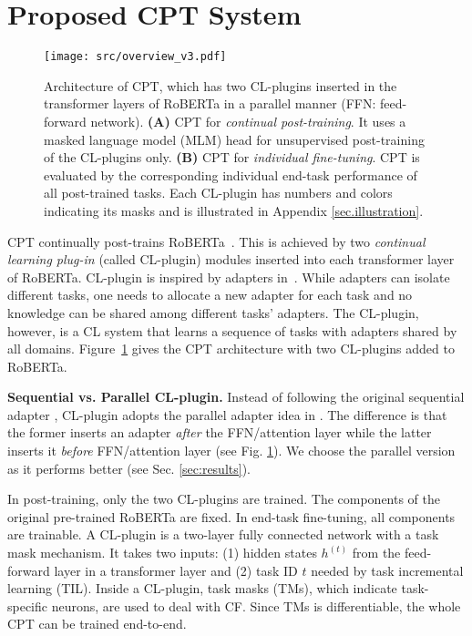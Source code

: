 \documentclass[11pt]{article}
\begin{document}
\section{Proposed CPT System}
\label{sec:cpt}



\begin{figure}[t!]
\centering
\texttt{[image: src/overview\_v3.pdf]}
\vspace{-6mm}
\caption{
Architecture of CPT, which has two CL-plugins inserted in the transformer layers of RoBERTa in a parallel manner (FFN: feed-forward network). \textbf{(A)} CPT for \textit{continual post-training}. It uses a masked language model (MLM) head for unsupervised post-training of the CL-plugins only. \textbf{(B)} CPT for \textit{individual fine-tuning}. CPT is evaluated by the corresponding individual end-task performance of all post-trained tasks. 
Each CL-plugin has numbers and colors indicating its masks and is illustrated in {Appendix} \ref{sec.illustration}.
}
\label{overview}
\end{figure}


CPT continually post-trains RoBERTa~\cite{DBLP:journals/corr/abs-1907-11692}. This is achieved by two \textit{continual learning plug-in} (called CL-plugin) modules inserted into each transformer layer of RoBERTa. CL-plugin is inspired by adapters in~\cite{Houlsby2019Parameter}. While adapters can isolate different tasks, one needs to allocate a new adapter for each task and no knowledge can be shared among different tasks' adapters. The CL-plugin, however, is a CL system that learns a sequence of tasks with adapters shared by all domains. 
Figure~\ref{overview} gives the CPT architecture with two CL-plugins added to RoBERTa. 

{\color{black}\textbf{Sequential vs. Parallel CL-plugin.} Instead of following the original sequential adapter \cite{Houlsby2019Parameter}, CL-plugin adopts the parallel adapter idea in \cite{DBLP:journals/corr/abs-2110-04366}. The difference is that the former inserts an adapter \textit{after} the FFN/attention layer while the latter inserts it \textit{before} FFN/attention layer (see Fig. \ref{overview}). We choose the parallel version as it performs better (see Sec. \ref{sec:results}). 
}

In post-training, only the two CL-plugins are trained. The components of the original pre-trained RoBERTa are fixed. In end-task fine-tuning, all components are trainable. A CL-plugin is a two-layer fully connected network with a task mask mechanism. It takes two inputs: (1) hidden states $h^{(t)}$ from the feed-forward layer in a transformer layer and (2) task ID $t$ needed by task incremental learning (TIL). 
Inside a CL-plugin, task masks (TMs), which indicate task- specific neurons, are used to {deal with CF}. Since TMs is differentiable, the whole CPT can be trained end-to-end. 
\end{document}
